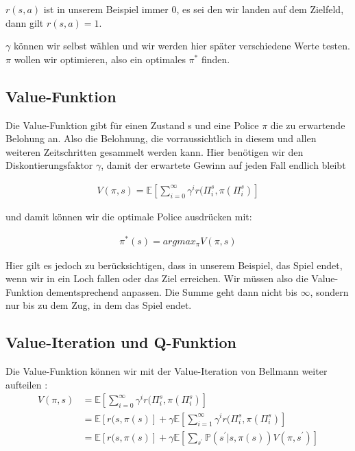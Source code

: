 $r(s,a)$ ist in unserem Beispiel immer 0, es sei den wir landen auf dem Zielfeld, dann gilt $r(s,a) = 1$.

$\gamma$ können wir selbst wählen und wir werden hier später verschiedene Werte testen. $\pi$ wollen wir optimieren, also ein optimales $\pi^{*}$ finden.

\subsection{Value-Funktion}
\label{subsec:V}

Die Value-Funktion gibt für einen Zustand s und eine Police $\pi$ die zu erwartende Belohung an. Also die Belohnung, die vorraussichtlich in diesem und allen weiteren Zeitschritten gesammelt werden kann. Hier benötigen wir den Diskontierungsfaktor $\gamma$, damit der erwartete Gewinn auf jeden Fall endlich bleibt \citep{DBLP:journals/jmlr/SallansH04}

\begin{align}
	V(\pi, s) = \mathbb{E}[\sum\limits_{i=0}^{\infty} \gamma^{i} r(\Pi_{i}^{s},\pi(\Pi_{i}^{s})]
\end{align}

und damit können wir die optimale Police ausdrücken mit:

\begin{align}
	\pi^{*}(s) = argmax_{\pi} V(\pi,s)
\end{align}

Hier gilt es jedoch zu berücksichtigen, dass in unserem Beispiel, das Spiel endet, wenn wir in ein Loch fallen oder das Ziel erreichen. Wir müssen also die Value-Funktion dementsprechend anpassen. Die Summe geht dann nicht bis $\infty$, sondern nur bis zu dem Zug, in dem das Spiel endet.

\subsection{Value-Iteration und Q-Funktion}
\label{subsec:VQ}

Die Value-Funktion können wir mit der Value-Iteration von Bellmann weiter aufteilen \citep{Bellman767}:
\begin{align*}
V(\pi, s) 	&= \mathbb{E}[ \sum\limits_{i=0}^{\infty} \gamma^{i} r(\Pi_{i}^{s},\pi( \Pi_{i}^{s} )] \\
			&= \mathbb{E}[r(s,\pi(s)] + \gamma \mathbb{E}[\sum\limits_{i=1}^{\infty} \gamma^{i} r(\Pi_{i}^{s},\pi(\Pi_{i}^{s})] \\
			&= \mathbb{E}[r(s,\pi(s)] + \gamma \mathbb{E}[\sum\limits_{s^{\prime}} \mathbb{P}(s^{\prime} | s, \pi(s) ) V(\pi, s^{\prime})]
\end{align*}

